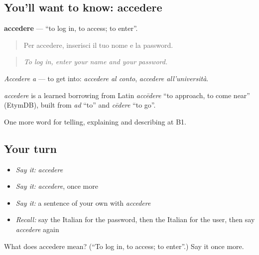 \subsection*{You'll want to know: accedere}
\textbf{accedere} — \textquotedblleft{}to log in, to access; to enter\textquotedblright{}.

\begin{quote}
Per accedere, inserisci il tuo nome e la password.
\end{quote}

\begin{quote}
\emph{To log in, enter your name and your password.}
\end{quote}

\emph{Accedere a} — to get into: \emph{accedere al conto}, \emph{accedere all'università}.

\begin{cousinweb}
\emph{accedere} is a learned borrowing from Latin \emph{accēdere} \textquotedblleft{}to approach, to come near\textquotedblright{} (EtymDB), built from \emph{ad} \textquotedblleft{}to\textquotedblright{} and \emph{cēdere} \textquotedblleft{}to go\textquotedblright{}.
\end{cousinweb}

\begin{grammarlens}[title={What you've built}]
One more word for telling, explaining and describing at B1.
\end{grammarlens}

\subsection*{Your turn}
\begin{itemize}
\raggedright
  \item \emph{Say it:} \emph{accedere}
  \item \emph{Say it:} \emph{accedere}, once more
  \item \emph{Say it:} a sentence of your own with \emph{accedere}
  \item \emph{Recall:} say the Italian for the password, then the Italian for the user, then say \emph{accedere} again
\end{itemize}

\begin{tcolorbox}[breakable,colback=teal!4,colframe=teal!35!black,title={Before you move on}]
What does accedere mean? (\textquotedblleft{}To log in, to access; to enter\textquotedblright{}.) Say it once more.
\end{tcolorbox}
